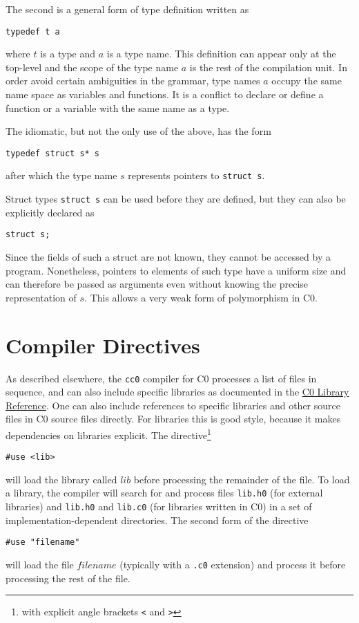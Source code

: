 \documentclass[11pt]{article}
\begin{document}
The second is a general form of type definition written as
\begin{verbatim}
typedef t a
\end{verbatim}
where $t$ is a type and $a$ is a type name.  This definition can
appear only at the top-level and the scope of the type name
$a$ is the rest of the compilation unit.  In order avoid certain
ambiguities in the grammar, type names $a$ occupy the same
name space as variables and functions.  It is a conflict to
declare or define a function or a variable with the same name
as a type.

The idiomatic, but not the only use of the above, has the form
\begin{verbatim}
typedef struct s* s
\end{verbatim}
after which the type name $s$ represents pointers
to \verb'struct s'.

Struct types \verb'struct s' can be used before they are defined,
but they can also be explicitly declared as
\begin{verbatim}
struct s;
\end{verbatim}
Since the fields of such a struct are not known, they cannot
be accessed by a program.  Nonetheless, pointers to elements
of such type have a uniform size and can therefore be passed
as arguments even without knowing the precise representation
of $s$.  This allows a very weak form of polymorphism in C0.

\section{Compiler Directives}

As described elsewhere, the \verb'cc0' compiler for C0 processes a
list of files in sequence, and can also include specific libraries as
documented in the
\href{http://www.cs.cmu.edu/~fp/courses/15122-s11/misc/c0-libraries.pdf}{C0
  Library Reference}.  One can also include references to specific
libraries and other source files in C0 source files directly.  For
libraries this is good style, because it makes dependencies on
libraries explicit.  The directive\footnote{with explicit angle
brackets \texttt{<} and \texttt{>}}
\begin{verbatim}
#use <lib>
\end{verbatim}
will load the library called $\mathit{lib}$ before processing the
remainder of the file.  To load a library, the compiler will search
for and process files \verb'lib.h0' (for external libraries) and
\verb'lib.h0' and \verb'lib.c0' (for libraries written in C0) in a set
of implementation-dependent directories.  The second form of the
directive
\begin{verbatim}
#use "filename"
\end{verbatim}
will load the file $\mathit{filename}$ (typically with a \verb'.c0'
extension) and process it before processing the rest of the file.
\end{document}
